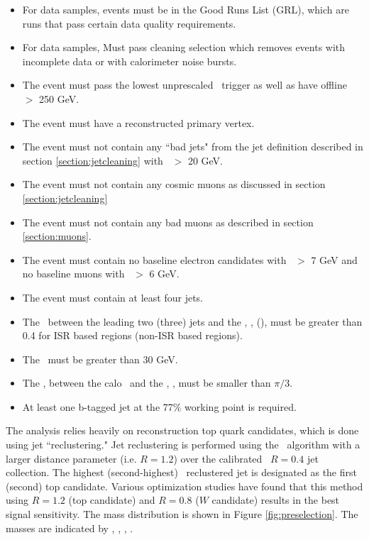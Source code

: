 \begin{itemize}
	\item For data samples, events must be in the Good Runs List (GRL), which are runs that pass certain data quality requirements.%
	\item For data samples, Must pass cleaning selection which removes events with incomplete data or with calorimeter noise bursts.
	\item The event must pass the lowest unprescaled \met\ trigger as well as have offline \met\ $>$ 250 GeV.
	\item The event must have a reconstructed primary vertex.
	\item The event must not contain any ``bad jets" from the jet definition described in section \ref{section:jetcleaning} with \pt\ $>$ 20 GeV. %
	\item The event must not contain any cosmic muons as discussed in section \ref{section:jetcleaning}
	\item The event must not contain any bad muons as described in section \ref{section:muons}.
	\item The event must contain no baseline electron candidates with \pt\ $>$ 7 GeV and no baseline muons with \pt\ $>$ 6 GeV.
	\item The event must contain at least four jets.
	\item The \dphi\ between the leading two (three) jets and the \met, \dphijettwomet, (\dphijetthreemet), must be greater than 0.4 for ISR based regions (non-ISR based regions). 
	\item The \mettrk\ must be greater than 30 GeV.
	\item The \dphi, between the calo \met\ and the \mettrk, \dphimettrk, must be smaller than $\pi/3$.
\item At least one b-tagged jet at the 77\% working point is required.
\end{itemize}

The analysis relies heavily on reconstruction top quark candidates, which is done using jet ``reclustering."  Jet reclustering is performed using the \antikt\ algorithm with a larger distance parameter (i.e. $R=1.2$) over the calibrated \antikt\ $R=0.4$ jet collection. The highest (second-highest) \pT\ reclustered jet is designated as the first (second) top candidate. Various optimization studies have found that this method using $R=1.2$ (top candidate) and $R=0.8$ ($W$ candidate) results in the best signal sensitivity. The mass distribution is shown in Figure \ref{fig:preselection}.  The masses are indicated by \mantikttwelvezero, \mantikttwelveone, \mantikteightzero, \mantikteightone. \\




